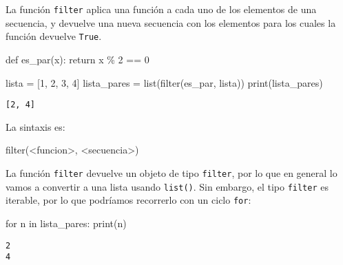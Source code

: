 \documentclass[
  letterpaper,
  DIV=11,
  numbers=noendperiod]{scrreprt}
\newenvironment{Shaded}{\begin{snugshade}}{\end{snugshade}}
\newcommand{\BuiltInTok}[1]{\textcolor[rgb]{0.00,0.23,0.31}{#1}}
\newcommand{\ControlFlowTok}[1]{\textcolor[rgb]{0.00,0.23,0.31}{#1}}
\newcommand{\DecValTok}[1]{\textcolor[rgb]{0.68,0.00,0.00}{#1}}
\newcommand{\KeywordTok}[1]{\textcolor[rgb]{0.00,0.23,0.31}{#1}}
\newcommand{\NormalTok}[1]{\textcolor[rgb]{0.00,0.23,0.31}{#1}}
\newcommand{\OperatorTok}[1]{\textcolor[rgb]{0.37,0.37,0.37}{#1}}
\begin{document}
La función \texttt{filter} aplica una función a cada uno de los
elementos de una secuencia, y devuelve una nueva secuencia con los
elementos para los cuales la función devuelve \texttt{True}.

\begin{Shaded}
\begin{Highlighting}[]
\KeywordTok{def}\NormalTok{ es\_par(x):}
  \ControlFlowTok{return}\NormalTok{ x }\OperatorTok{\%} \DecValTok{2} \OperatorTok{==} \DecValTok{0}

\NormalTok{lista }\OperatorTok{=}\NormalTok{ [}\DecValTok{1}\NormalTok{, }\DecValTok{2}\NormalTok{, }\DecValTok{3}\NormalTok{, }\DecValTok{4}\NormalTok{]}
\NormalTok{lista\_pares }\OperatorTok{=} \BuiltInTok{list}\NormalTok{(}\BuiltInTok{filter}\NormalTok{(es\_par, lista))}
\BuiltInTok{print}\NormalTok{(lista\_pares)}
\end{Highlighting}
\end{Shaded}

\begin{verbatim}
[2, 4]
\end{verbatim}

La sintaxis es:

\begin{Shaded}
\begin{Highlighting}[]
\BuiltInTok{filter}\NormalTok{(}\OperatorTok{\textless{}}\NormalTok{funcion}\OperatorTok{\textgreater{}}\NormalTok{, }\OperatorTok{\textless{}}\NormalTok{secuencia}\OperatorTok{\textgreater{}}\NormalTok{)}
\end{Highlighting}
\end{Shaded}

La función \texttt{filter} devuelve un objeto de tipo \texttt{filter},
por lo que en general lo vamos a convertir a una lista usando
\texttt{list()}. Sin embargo, el tipo \texttt{filter} es iterable, por
lo que podríamos recorrerlo con un ciclo \texttt{for}:

\begin{Shaded}
\begin{Highlighting}[]
\ControlFlowTok{for}\NormalTok{ n }\KeywordTok{in}\NormalTok{ lista\_pares:}
  \BuiltInTok{print}\NormalTok{(n)}
\end{Highlighting}
\end{Shaded}

\begin{verbatim}
2
4
\end{verbatim}
\end{document}
